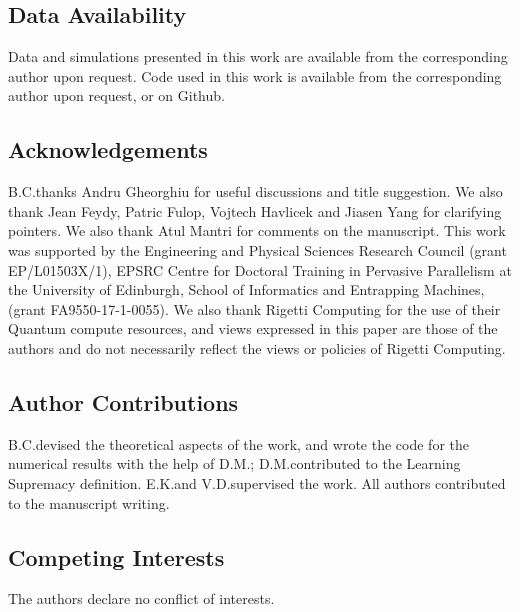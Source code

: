 \documentclass[10.3pt, a4paper ]{article}
\begin{document}

\maketitle
% 
\begin{multicols}{2}







\subsection*{Data Availability}\label{sec:data_availability}
Data and simulations presented in this work are available from the corresponding author upon request. Code used in this work is available from the corresponding author upon request, or on Github\cite{briancoyle_implementation_2019}.
\subsection*{Acknowledgements}\label{sec:acknowledgements}

B.C.\@ thanks Andru Gheorghiu for useful discussions and title suggestion. We also thank Jean Feydy, Patric Fulop, Vojtech Havlicek and Jiasen Yang for clarifying pointers. We also thank Atul Mantri for comments on the manuscript. This work was supported by the Engineering and Physical Sciences Research Council (grant EP/L01503X/1), EPSRC Centre for Doctoral Training in Pervasive Parallelism at the University of Edinburgh, School of Informatics and Entrapping Machines, (grant FA9550-17-1-0055). We also thank Rigetti Computing for the use of their Quantum compute resources, and views expressed in this paper are those of the authors and do not necessarily reflect the views or policies of Rigetti Computing.

\subsection*{Author Contributions}
B.C.\@ devised the theoretical aspects of the work, and wrote the code for the numerical results with the help of D.M.\@; D.M.\@ contributed to the Learning Supremacy definition. 
E.K.\@ and V.D.\@ supervised the work. All authors contributed to the manuscript writing. 

\subsection*{Competing Interests}
The authors declare no conflict of interests.

% 


\end{multicols}
\end{document}
